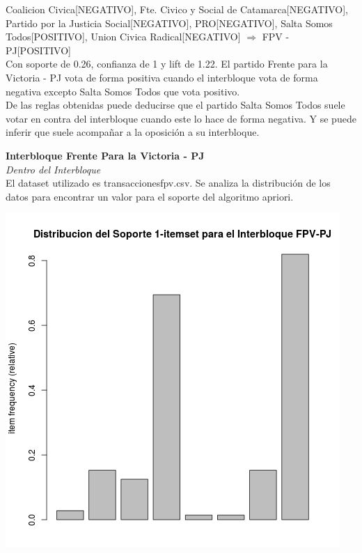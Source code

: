 \documentclass{endm}
\begin{document}
{Coalicion Civica[NEGATIVO],
Fte. Civico y Social de Catamarca[NEGATIVO],    
Partido por la Justicia Social[NEGATIVO],       
PRO[NEGATIVO], 
Salta Somos Todos[POSITIVO], Union Civica Radical[NEGATIVO]} $\Longrightarrow$ {FPV - PJ[POSITIVO]} \\

Con soporte de 0.26, confianza de 1 y lift de 1.22. El partido Frente para la Victoria - PJ vota de forma positiva cuando el interbloque vota de forma negativa excepto Salta Somos Todos que vota positivo.\\

De las reglas obtenidas puede deducirse que el partido Salta Somos Todos suele votar en contra del interbloque cuando este lo hace de forma negativa. Y se puede inferir que suele acompañar a la oposición a su interbloque. 

\textbf{Interbloque Frente Para la Victoria - PJ}\\

\textit{Dentro del Interbloque} \\

El dataset utilizado es transaccionesfpv.csv. Se analiza la distribución de los datos para encontrar un valor para el soporte del algoritmo apriori. \\

\begin{center}
\includegraphics[scale=0.4]{graficos/soportesInterbloquesFpv.png}
\end{center}
\end{document}
